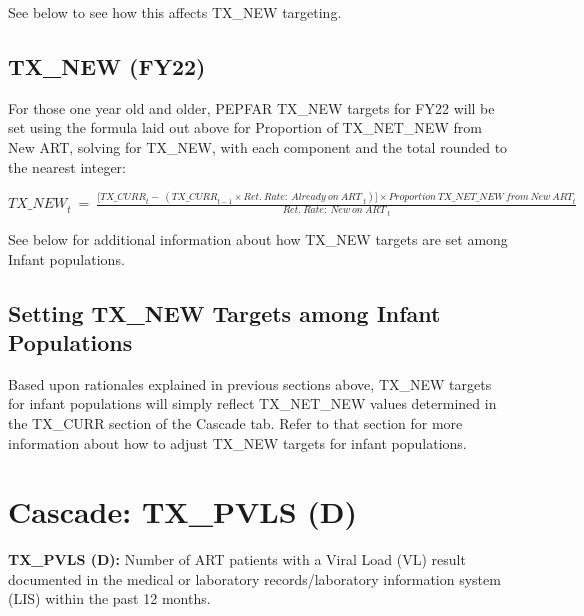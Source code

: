 \documentclass[
  openany]{book}
\begin{document}
See below to see how this affects TX\_NEW targeting.

\hypertarget{tx_new-fy22}{%
\subsection{TX\_NEW (FY22)}\label{tx_new-fy22}}

For those one year old and older, PEPFAR TX\_NEW targets for FY22 will be
set using the formula laid out above for Proportion of TX\_NET\_NEW from
New ART, solving for TX\_NEW, with each component and the total rounded
to the nearest integer:

\begin{center} ${TX\_NEW}_{t}\  = \ \frac{\lbrack{TX\_ CURR}_{t} - \ ({TX\_ CURR}_{t - 1} \times {Ret.\ Rate:\ Already\ on\ ART\ }_{t})\rbrack \times {Proportion\ TX\_ NET\_ NEW\ from\ New\ ART}_{t}}{{Ret.\ Rate:\ New\ on\ ART\ }_{t}}$ \end{center}

See below for additional information about how TX\_NEW targets are set
among Infant populations.

\hypertarget{setting-tx_new-targets-among-infant-populations}{%
\subsection{Setting TX\_NEW Targets among Infant Populations}\label{setting-tx_new-targets-among-infant-populations}}

Based upon rationales explained in previous sections above, TX\_NEW
targets for infant populations will simply reflect TX\_NET\_NEW values
determined in the TX\_CURR section of the Cascade tab. Refer to that
section for more information about how to adjust TX\_NEW targets for
infant populations.

\hypertarget{cascade-tx_pvls-d}{%
\section{Cascade: TX\_PVLS (D)}\label{cascade-tx_pvls-d}}

\textbf{TX\_PVLS (D):} Number of ART patients with a Viral Load (VL) result
documented in the medical or laboratory records/laboratory information
system (LIS) within the past 12 months.
\end{document}
